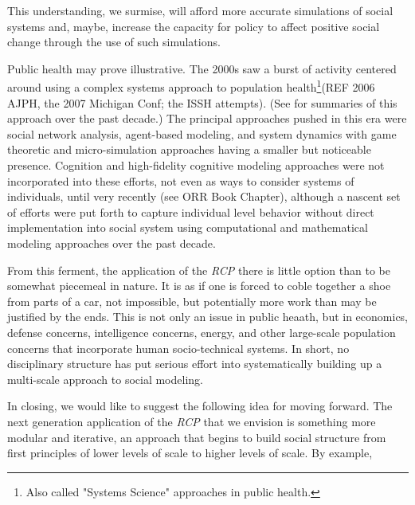 \documentclass{article}
\begin{document}
This understanding, we surmise, will afford more accurate simulations of social systems and, maybe, increase the capacity for policy to affect positive social change through the use of such simulations.

Public health may prove illustrative.  The 2000s saw a burst of activity centered around using a complex systems approach to population health\footnote{Also called "Systems Science" approaches in public health.}(REF 2006 AJPH, the 2007 Michigan Conf; the ISSH attempts). (See \cite{Galea, 2017; Kaplan, 2017} for summaries of this approach over the past decade.)  The principal approaches pushed in this era were social network analysis, agent-based modeling, and system dynamics with game theoretic and micro-simulation approaches having a smaller but noticeable presence.  Cognition and high-fidelity cognitive modeling approaches were not incorporated into these efforts, not even as ways to consider systems of individuals, until very recently (see ORR Book Chapter), although a nascent set of efforts were put forth to capture individual level behavior without direct implementation into social system \cite{Orr 2017} using computational and mathematical modeling approaches over the past decade.

From this ferment, the application of the \textit{RCP} there is little option than to be somewhat piecemeal in nature.  It is as if one is forced to coble together a shoe from parts of a car, not impossible, but potentially more work than may be justified by the ends. This is not only an issue in public heaath, but in economics, defense concerns, intelligence concerns, energy, and other large-scale population concerns that incorporate human socio-technical systems.  In short, no disciplinary structure has put serious effort into systematically building up a multi-scale approach to social modeling.

In closing, we would like to suggest the following idea for moving forward.  The next generation application of the \textit{RCP} that we envision is something more modular and iterative, an approach that begins to build social structure from first principles of lower levels of scale to higher levels of scale.  By example, 








\end{document}
